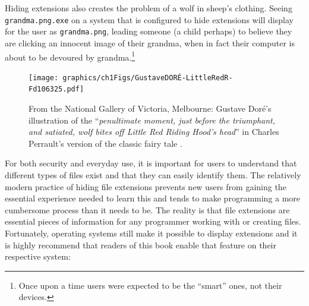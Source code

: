 Hiding extensions also creates the problem of a wolf in sheep's clothing. Seeing \texttt{grandma.png.exe} on a system that is configured to hide extensions will display for the user as \texttt{grandma.png}, leading someone (a child perhaps) to believe they are clicking an innocent image of their grandma, when in fact their computer is about to be devoured by grandma.\footnote{Once upon a time users were expected to be the ``smart'' ones, not their devices.}

\vspace{1em}

\begin{figure}[h]
\centering
\texttt{[image: graphics/ch1Figs/GustaveDORÉ-LittleRedR-Fd106325.pdf]}
\caption{From the National Gallery of Victoria, Melbourne: Gustave Doré's illustration of the ``\textit{penultimate moment, just before the triumphant, and satiated, wolf bites off Little Red Riding Hood’s head}'' in Charles Perrault's version of the classic fairy tale \parencite{Dore1862}.}
\end{figure}

For both security and everyday use, it is important for users to understand that different types of files exist and that they can easily identify them. The relatively modern practice of hiding file extensions prevents new users from gaining the essential experience needed to learn this and tends to make programming a more cumbersome process than it needs to be. The reality is that file extensions are essential pieces of information for any programmer working with or creating files. Fortunately, operating systems still make it possible to display extensions and it is highly recommend that readers of this book enable that feature on their respective system:

